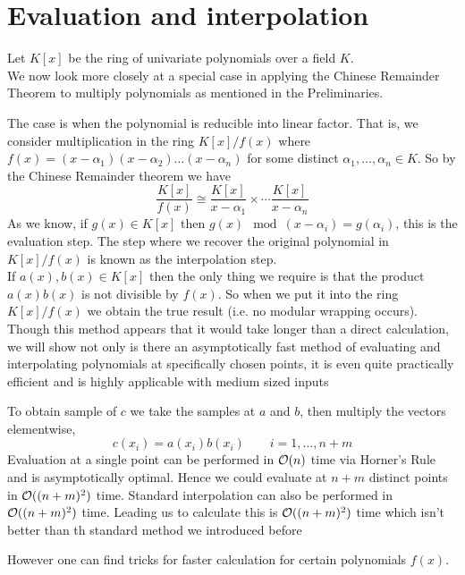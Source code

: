 \chapter{Evaluation and interpolation}\label{chapter2}

Let $K[x]$ be the ring of univariate polynomials over a field $K$.\\
We now look more closely at a special case in applying the Chinese Remainder Theorem to multiply polynomials as mentioned in the Preliminaries.

The case is when the polynomial is reducible into linear factor. That is, we consider multiplication in the ring $K[x] / f(x)$ where $f(x) = (x - \alpha_1)(x - \alpha_2) \ldots (x - \alpha_n)$ for some distinct $\alpha_1, \ldots, \alpha_n \in K$. So by the Chinese Remainder theorem we have
\[
    \frac{K[x]}{f(x)} \cong \frac{K[x]}{x - \alpha_1} \times \cdots \frac{K[x]}{x - \alpha_n}
\]
As we know, if $g(x) \in K[x]$ then $g(x) \mod (x - \alpha_i) = g(\alpha_i)$, this is the evaluation step. The step where we recover the original polynomial in $K[x]/f(x)$ is known as the interpolation step.\\

If $a(x), b(x) \in K[x]$ then the only thing we require is that the product $a(x)b(x)$ is not divisible by $f(x)$. So when we put it into the ring $K[x]/f(x)$ we obtain the true result (i.e. no modular wrapping occurs).\\
Though this method appears that it would take longer than a direct calculation, we will show not only is there an asymptotically fast method of evaluating and interpolating polynomials at specifically chosen points, it is even quite practically efficient and is highly applicable with medium sized inputs

To obtain sample of $c$ we take the samples at $a$ and $b$, then multiply the vectors elementwise,
\[
  c(x_i) = a(x_i)b(x_i) \qquad i = 1, \ldots, n + m
\]
Evaluation at a single point can be performed in $\mathcal O(n)$ time via Horner's Rule and is asymptotically optimal. Hence we could evaluate at $n + m$ distinct points in $\mathcal O((n + m)^2)$ time. Standard interpolation can also be performed in $\mathcal O((n+m)^2)$ time. Leading us to calculate this is $\mathcal O((n + m)^2)$ time which isn't better than th standard method we introduced before

However one can find tricks for faster calculation for certain polynomials $f(x)$.

